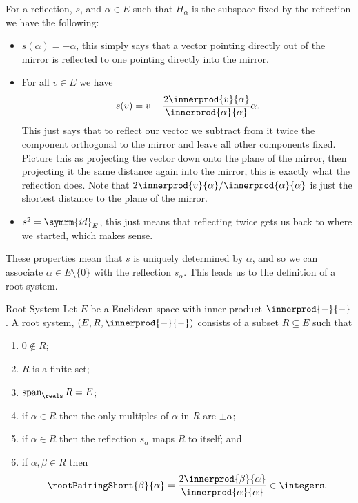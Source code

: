 \documentclass[fleqn]{NotesClass}
\DeclareMathOperator{\Span}{span}
\newcommand{\id}{\symrm{id}}
\begin{document}
    For a reflection, \(s\), and \(\alpha \in E\) such that \(H_\alpha\) is the subspace fixed by the reflection we have the following:
    \begin{itemize}
        \item \(s(\alpha) = -\alpha\), this simply says that a vector pointing directly out of the mirror is reflected to one pointing directly into the mirror.
        \item For all \(v \in E\) we have
        \begin{equation}
            s(v) = v - \frac{2\innerprod{v}{\alpha}}{\innerprod{\alpha}{\alpha}} \alpha.
        \end{equation}
        This just says that to reflect our vector we subtract from it twice the component orthogonal to the mirror and leave all other components fixed.
        Picture this as projecting the vector down onto the plane of the mirror, then projecting it the same distance again into the mirror, this is exactly what the reflection does.
        Note that \(2\innerprod{v}{\alpha}/\innerprod{\alpha}{\alpha}\) is just the shortest distance to the plane of the mirror.
        \item \(s^2 = \id_E\), this just means that reflecting twice gets us back to where we started, which makes sense.
    \end{itemize}
    
    These properties mean that \(s\) is uniquely determined by \(\alpha\), and so we can associate \(\alpha \in E\setminus\{0\}\) with the reflection \(s_\alpha\).
    This leads us to the definition of a root system.
    
    \begin{dfn}{Root System}{}
        Let \(E\) be a Euclidean space with inner product \(\innerprod{-}{-}\).
        A root system, \((E, R, \innerprod{-}{-})\) consists of a subset \(R \subseteq E\) such that
        \begin{enumerate}
            \item \(0 \notin R\);
            \item \(R\) is a finite set;
            \item \(\Span_{\reals} R = E\);
            \item if \(\alpha \in R\) then the only multiples of \(\alpha\) in \(R\) are \(\pm \alpha\);
            \item if \(\alpha \in R\) then the reflection \(s_\alpha\) maps \(R\) to itself; and
            \item if \(\alpha, \beta \in R\) then
            \begin{equation}
                \rootPairingShort{\beta}{\alpha} = \frac{2\innerprod{\beta}{\alpha}}{\innerprod{\alpha}{\alpha}} \in \integers.
            \end{equation}
        \end{enumerate}
    \end{dfn}
    
\end{document}
